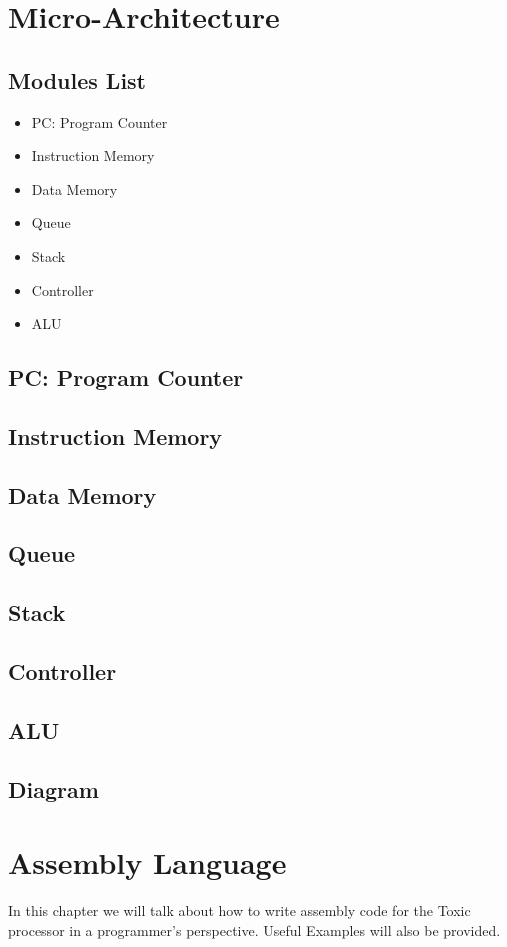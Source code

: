 \documentclass[11pt]{report}
\begin{document}
    \chapter{Micro-Architecture}
    \label{chapter:implementation}
    \section{Modules List}
    \begin{itemize}
        \item PC: Program Counter
        \item Instruction Memory
        \item Data Memory
        \item Queue
        \item Stack
        \item Controller
        \item ALU
    \end{itemize}
    \section{PC: Program Counter}
    \label{section:pc}
    \section{Instruction Memory}
    \section{Data Memory}
    \section{Queue}
    \section{Stack}
    \section{Controller}
    \section{ALU}
    \section{Diagram}

    \chapter{Assembly Language}
    In this chapter we will talk about how to write assembly code for the Toxic processor
    in a programmer's perspective. Useful Examples will also be provided.
\end{document}
